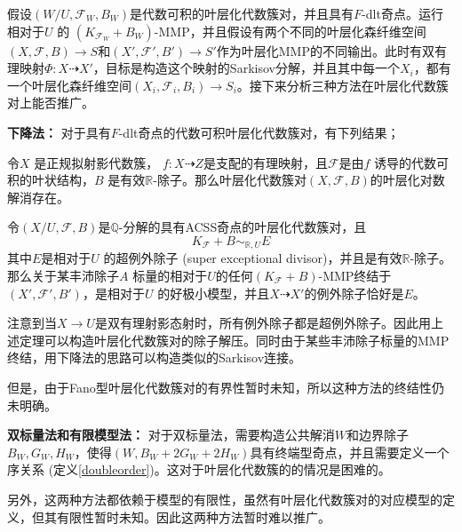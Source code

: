 假设$(W/U,\mathcal{F}_{W},B_{W})$是代数可积的叶层化代数簇对，并且具有$F$-dlt奇点。运行相对于$U$ 的 $(K_{\mathcal{F}_{W}}+B_{W})$-MMP，并且假设有两个不同的叶层化森纤维空间$(X,\mathcal{F},B)\to S$和$(X',\mathcal{F}',B')\to S'$作为叶层化MMP的不同输出。此时有双有理映射$\Phi:X \dashrightarrow X'$，目标是构造这个映射的Sarkisov分解，并且其中每一个$X_{i}$，都有一个叶层化森纤维空间$(X_{i},\mathcal{F}_{i},B_{i})\to S_{i}$。接下来分析三种方法在叶层化代数簇对上能否推广。

\textbf{下降法：}
对于具有$F$-dlt奇点的代数可积叶层化代数簇对，有下列结果；
\begin{lemma}\cite[Lemma 6.2.4]{chlx}
  令$X$ 是正规拟射影代数簇， $f:X \dashrightarrow Z$是支配的有理映射，且$\mathcal{F}$是由$f$ 诱导的代数可积的叶状结构，$B$ 是有效$\mathbb{R}$-除子。那么叶层化代数簇对$(X,\mathcal{F},B)$的叶层化对数解消存在。
\end{lemma}
\begin{theorem}[压缩超例外除子]\cite[Theorem 9.4.1]{chlx}
 令$(X/U,\mathcal{F},B)$是$\mathbb{Q}$-分解的具有ACSS奇点的叶层化代数簇对，且
 \[ K_{\mathcal{F}}+B \sim_{\mathbb{R},U}E \]
其中$E$是相对于$U$ 的超例外除子 (super exceptional divisor)，并且是有效$\mathbb{R}$-除子。那么关于某丰沛除子$A$ 标量的相对于$U$的任何$(K_{\mathcal{F}}+B)$-MMP终结于$(X',\mathcal{F}',B')$，是相对于$U$ 的好极小模型，并且$X \dashrightarrow X' $的例外除子恰好是$E$。 
\end{theorem}
注意到当$X\to U$是双有理射影态射时，所有例外除子都是超例外除子。因此用上述定理可以构造叶层化代数簇对的除子解压。同时由于某些丰沛除子标量的MMP终结，用下降法的思路可以构造类似的Sarkisov连接。

但是，由于Fano型叶层化代数簇对的有界性暂时未知，所以这种方法的终结性仍未明确。

\textbf{双标量法和有限模型法：}
对于双标量法，需要构造公共解消$W$和边界除子$B_{W},G_{W},H_{W}$，使得$(W,B_{W}+2G_{W}+2H_{W})$具有终端型奇点，并且需要定义一个序关系 (定义\ref{doubleorder})。这对于叶层化代数簇的的情况是困难的。

另外，这两种方法都依赖于模型的有限性，虽然有叶层化代数簇对的对应模型的定义，但其有限性暂时未知。因此这两种方法暂时难以推广。
